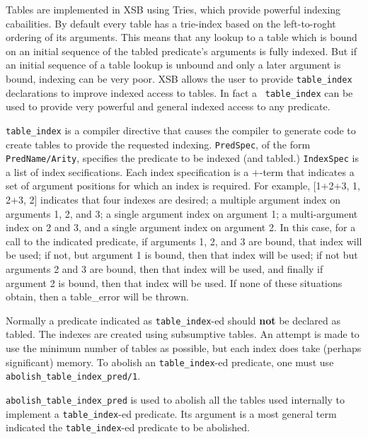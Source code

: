 \begin{description}
\begin{description}

Tables are implemented in XSB using Tries, which provide powerful
indexing cabailities.  By default every table has a trie-index based
on the left-to-roght ordering of its arguments.  This means that any
lookup to a table which is bound on an initial sequence of the tabled
predicate's arguments is fully indexed.  But if an initial sequence of
a table lookup is unbound and only a later argument is bound, indexing
can be very poor.  XSB allows the user to provide {\tt table\_index}
declarations to improve indexed access to tables.  In fact a {\tt
  table\_index} can be used to provide very powerful and general
indexed access to any predicate.

%
{\tt table\_index} is a compiler directive that causes the compiler to
generate code to create tables to provide the requested indexing.
{\tt PredSpec}, of the form {\tt PredName/Arity}, specifies the
predicate to be indexed (and tabled.)  {\tt IndexSpec} is a list of
index secifications.  Each index specification is a $+$-term that
indicates a set of argument positions for which an index is required.
For example, [1$+$2$+$3, 1, 2$+$3, 2] indicates that four indexes are
desired; a multiple argument index on arguments 1, 2, and 3; a single
argument index on argument 1; a multi-argument index on 2 and 3, and a
single argument index on argument 2.  In this case, for a call to the
indicated predicate, if arguments 1, 2, and 3 are bound, that index
will be used; if not, but argument 1 is bound, then that index will be
used; if not but arguments 2 and 3 are bound, then that index will be
used, and finally if argument 2 is bound, then that index will be
used.  If none of these situations obtain, then a table\_error will be
thrown.

Normally a predicate indicated as {\tt table\_index}-ed should {\bf
  not} be declared as tabled.  The indexes are created using
subsumptive tables.  An attempt is made to use the minimum number of
tables as possible, but each index does take (perhaps significant)
memory.  To abolish an {\tt table\_index}-ed predicate, one must use
{\tt abolish\_table\_index\_pred/1}.

%
{\tt abolish\_table\_index\_pred} is used to abolish all the tables
used internally to implement a {\tt table\_index}-ed predicate.  Its
argument is a most general term indicated the {\tt table\_index}-ed
predicate to be abolished.


\end{description}
\end{description}
